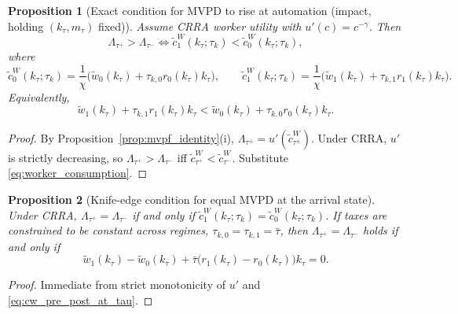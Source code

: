 \documentclass{article}
\newtheorem{proposition}{Proposition}
\begin{document}
\begin{proposition}[Exact condition for MVPD to rise at automation (impact, holding $(k_\tau,m_\tau)$ fixed)]
\label{prop:mvpf_rise_impact}
Assume CRRA worker utility with $u'(c)=c^{-\gamma}$. Then
\begin{equation}
\label{eq:mvpf_rise_impact}
\Lambda_{\tau^+} > \Lambda_{\tau^-}
\iff
\widetilde c^{W}_1(k_\tau;\tau_k) < \widetilde c^{W}_0(k_\tau;\tau_k),
\end{equation}
where
\begin{equation}
\label{eq:cw_pre_post_at_tau}
\widetilde c^{W}_0(k_\tau;\tau_k)=\frac{1}{\chi}\Big(\widetilde w_0(k_\tau)+\tau_{k,0}r_0(k_\tau)k_\tau\Big),
\qquad
\widetilde c^{W}_1(k_\tau;\tau_k)=\frac{1}{\chi}\Big(\widetilde w_1(k_\tau)+\tau_{k,1}r_1(k_\tau)k_\tau\Big).
\end{equation}
Equivalently,
\begin{equation}
\label{eq:impact_inequality_resources}
\widetilde w_1(k_\tau)+\tau_{k,1}r_1(k_\tau)k_\tau
<
\widetilde w_0(k_\tau)+\tau_{k,0}r_0(k_\tau)k_\tau.
\end{equation}
\end{proposition}

\begin{proof}
By Proposition~\ref{prop:mvpf_identity}(i), $\Lambda_{\tau^\pm}=u'(\widetilde c^W_{\tau^\pm})$. Under CRRA, $u'$ is strictly decreasing, so $\Lambda_{\tau^+}>\Lambda_{\tau^-}$ iff $\widetilde c^W_{\tau^+}<\widetilde c^W_{\tau^-}$. Substitute \eqref{eq:worker_consumption}.
\end{proof}

\begin{proposition}[Knife-edge condition for equal MVPD at the arrival state]
\label{prop:mvpf_equal_impact}
Under CRRA, $\Lambda_{\tau^+}=\Lambda_{\tau^-}$ if and only if $\widetilde c^{W}_1(k_\tau;\tau_k)=\widetilde c^{W}_0(k_\tau;\tau_k)$. If taxes are constrained to be constant across regimes, $\tau_{k,0}=\tau_{k,1}=\bar\tau$, then $\Lambda_{\tau^+}=\Lambda_{\tau^-}$ holds if and only if
\begin{equation}
\label{eq:knife_edge_constant_tax}
\widetilde w_1(k_\tau)-\widetilde w_0(k_\tau)
+
\bar\tau\Big(r_1(k_\tau)-r_0(k_\tau)\Big)k_\tau
=0.
\end{equation}
\end{proposition}

\begin{proof}
Immediate from strict monotonicity of $u'$ and \eqref{eq:cw_pre_post_at_tau}.
\end{proof}
\end{document}
